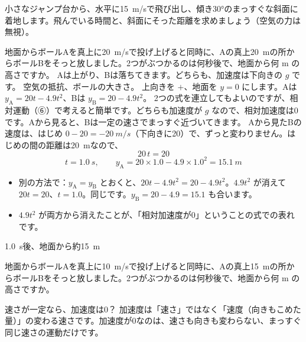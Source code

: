 \begin{jibun}
小さなジャンプ台から、水平に\qty{15}{m/s}で飛び出し、傾き30°のまっすぐな斜面に着地します。飛んでいる時間と、斜面にそった距離を求めましょう（空気の力は無視）。
\end{jibun}

\begin{phreidai}[2つのボールがぶつかる時刻]
\label{ph:力-1:ex14}地面からボールAを真上に\qty{20}{m/s}で投げ上げると同時に、Aの真上\qty{20}{m}の所からボールBをそっと放しました。2つがぶつかるのは何秒後で、地面から何 m の高さですか。
\phbamen
Aは上がり、Bは落ちてきます。どちらも、加速度は下向きの $g$ です。
\phmushi
空気の抵抗、ボールの大きさ。
\phzu
上向きを $+$、地面を $y=0$ にします。Aは $y_{\mathrm A}=20t-4.9t^2$、Bは $y_{\mathrm B}=20-4.9t^2$。
\phriyu
2つの式を連立してもよいのですが、相対運動（⑥）で考えると簡単です。どちらも加速度が $g$ なので、相対加速度は0です。Aから見ると、Bは一定の速さでまっすぐ近づいてきます。
\phtateru
Aから見たBの速度は、はじめ $0-20=\qty{-20}{m/s}$（下向きに20）で、ずっと変わりません。はじめの間の距離は\qty{20}{m}なので、
\[ 20\,t=20 \]
\phtoku
\[ t=\qty{1.0}{s},\qquad y_{\mathrm A}=20\times1.0-4.9\times1.0^2=\qty{15.1}{m} \]
\phtashikame
\begin{itemize}[leftmargin=1.2\zw, itemsep=1pt, topsep=1pt, label={\color{bkTheme}●}]
\item 別の方法で：$y_{\mathrm A}=y_{\mathrm B}$ とおくと、$20t-4.9t^2=20-4.9t^2$。$4.9t^2$ が消えて $20t=20$、$t=1.0$。同じです。$y_{\mathrm B}=20-4.9=15.1$ も合います。
\item $4.9t^2$ が両方から消えたことが、「相対加速度が0」ということの式での表れです。
\end{itemize}
\kotae \qty{1.0}{s}後、地面から約\qty{15}{m}
\end{phreidai}
\begin{jibun}
地面からボールAを真上に\qty{10}{m/s}で投げ上げると同時に、Aの真上\qty{15}{m}の所からボールBをそっと放しました。2つがぶつかるのは何秒後で、地面から何 m の高さですか。
\end{jibun}


\begin{tsumazuki}{速さが一定なら、加速度は0？}
加速度は「速さ」ではなく「速度（向きもこめた量）」の変わる速さです。加速度が0なのは、速さも向きも変わらない、まっすぐ同じ速さの運動だけです。
\end{tsumazuki}

